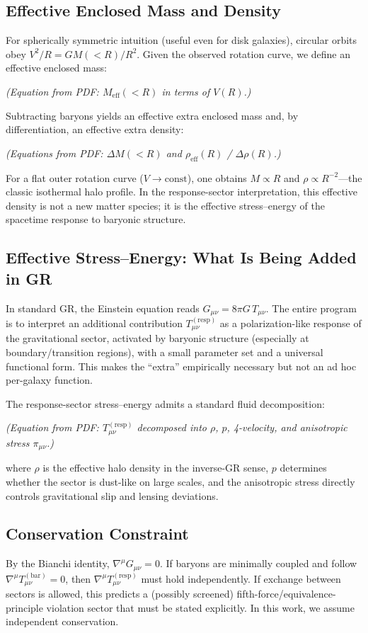 \subsection{Effective Enclosed Mass and Density}
For spherically symmetric intuition (useful even for disk galaxies), circular orbits obey $V^2/R = GM(<R)/R^2$. Given the observed rotation curve, we define an effective enclosed mass:

\emph{(Equation from PDF: $M_{\mathrm{eff}}(<R)$ in terms of $V(R)$.)}

Subtracting baryons yields an effective extra enclosed mass and, by differentiation, an effective extra density:

\emph{(Equations from PDF: $\Delta M(<R)$ and $\rho_{\mathrm{eff}}(R)$ / $\Delta\rho(R)$.)}

For a flat outer rotation curve ($V \to \mathrm{const}$), one obtains $M \propto R$ and $\rho \propto R^{-2}$---the classic isothermal halo profile. In the response-sector interpretation, this effective density is not a new matter species; it is the effective stress--energy of the spacetime response to baryonic structure.

\subsection{Effective Stress–Energy: What Is Being Added in GR}
In standard GR, the Einstein equation reads $G_{\mu\nu} = 8\pi G\,T_{\mu\nu}$. The entire program is to interpret an additional contribution $T^{(\mathrm{resp})}_{\mu\nu}$ as a polarization-like response of the gravitational sector, activated by baryonic structure (especially at boundary/transition regions), with a small parameter set and a universal functional form. This makes the ``extra'' empirically necessary but not an ad hoc per-galaxy function.

The response-sector stress--energy admits a standard fluid decomposition:

\emph{(Equation from PDF: $T^{(\mathrm{resp})}_{\mu\nu}$ decomposed into $\rho$, $p$, 4-velocity, and anisotropic stress $\pi_{\mu\nu}$.)}

where $\rho$ is the effective halo density in the inverse-GR sense, $p$ determines whether the sector is dust-like on large scales, and the anisotropic stress directly controls gravitational slip and lensing deviations.

\subsection{Conservation Constraint}
By the Bianchi identity, $\nabla^\mu G_{\mu\nu} = 0$. If baryons are minimally coupled and follow $\nabla^\mu T^{(\mathrm{bar})}_{\mu\nu} = 0$, then $\nabla^\mu T^{(\mathrm{resp})}_{\mu\nu}$ must hold independently. If exchange between sectors is allowed, this predicts a (possibly screened) fifth-force/equivalence-principle violation sector that must be stated explicitly. In this work, we assume independent conservation.
